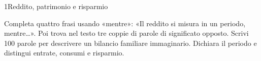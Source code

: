 \begin{lettura}{1}{Reddito, patrimonio e risparmio}






\lingua
Completa quattro frasi usando «mentre»: «Il reddito si misura in un periodo, mentre…». Poi trova nel testo tre coppie di parole di significato opposto.
\scrittura
Scrivi 100 parole per descrivere un bilancio familiare immaginario. Dichiara il periodo e distingui entrate, consumi e risparmio.

\end{lettura}


